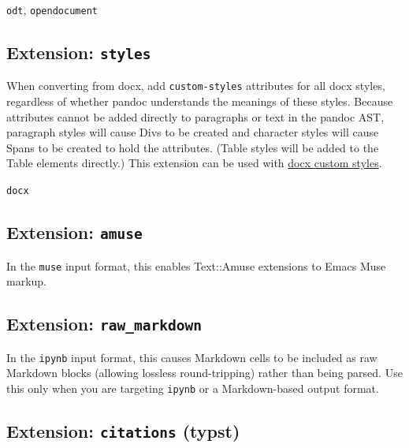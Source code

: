 \documentclass[
  b5paper
]{book}
\providecommand{\tightlist}{%
  \setlength{\itemsep}{0pt}\setlength{\parskip}{0pt}}
\begin{document}
\begin{description}
\tightlist
\item[output formats]
\texttt{odt}, \texttt{opendocument}
\end{description}

\subsection{\texorpdfstring{Extension:
\texttt{styles}}{Extension: styles}}\label{ext-styles}

When converting from docx, add \texttt{custom-styles} attributes for all
docx styles, regardless of whether pandoc understands the meanings of
these styles. Because attributes cannot be added directly to paragraphs
or text in the pandoc AST, paragraph styles will cause Divs to be
created and character styles will cause Spans to be created to hold the
attributes. (Table styles will be added to the Table elements directly.)
This extension can be used with \hyperref[custom-styles]{docx custom
styles}.

\begin{description}
\tightlist
\item[input formats]
\texttt{docx}
\end{description}

\subsection{\texorpdfstring{Extension:
\texttt{amuse}}{Extension: amuse}}\label{extension-amuse}

In the \texttt{muse} input format, this enables Text::Amuse extensions
to Emacs Muse markup.

\subsection{\texorpdfstring{Extension:
\texttt{raw\_markdown}}{Extension: raw\_markdown}}\label{extension-raw_markdown}

In the \texttt{ipynb} input format, this causes Markdown cells to be
included as raw Markdown blocks (allowing lossless round-tripping)
rather than being parsed. Use this only when you are targeting
\texttt{ipynb} or a Markdown-based output format.

\subsection{\texorpdfstring{Extension: \texttt{citations}
(typst)}{Extension: citations (typst)}}\label{typst-citations}
\end{document}
